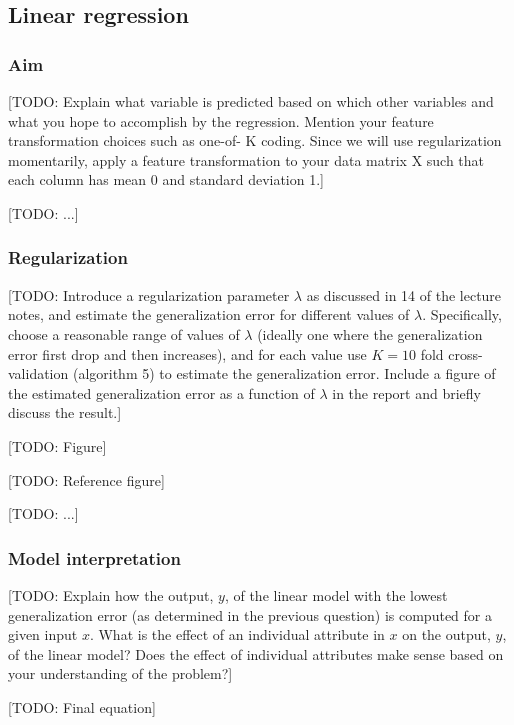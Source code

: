 \documentclass[dtu]{dtuarticle}
\newcommand{\todo}[1]{\color{red}[TODO: #1]\color{black}}
\begin{document}
	\subsection{Linear regression}

	\subsubsection{Aim}

	\todo{Explain what variable is predicted based on which other variables and what you hope to
		accomplish by the regression. Mention your feature transformation choices such as one-of-
		K coding. Since we will use regularization momentarily, apply a feature transformation to
		your data matrix X such that each column has mean 0 and standard deviation 1.}

	\todo{...}

	\subsubsection{Regularization}

	\todo{Introduce a regularization parameter $\lambda$ as discussed in 14 of the lecture notes, and estimate
		the generalization error for different values of $\lambda$. Specifically, choose a reasonable range of
		values of $\lambda$ (ideally one where the generalization error first drop and then increases), and
		for each value use $K = 10$ fold cross-validation (algorithm 5) to estimate the generalization
		error. Include a figure of the estimated generalization error as a function of $\lambda$ in the report
		and briefly discuss the result.}

	\todo{Figure}

	\todo{Reference figure}

	\todo{...}

	\subsubsection{Model interpretation}

	\todo{Explain how the output, $y$, of the linear model with the lowest generalization error (as
		determined in the previous question) is computed for a given input $x$. What is the effect
		of an individual attribute in $x$ on the output, $y$, of the linear model? Does the effect of
		individual attributes make sense based on your understanding of the problem?}

	\todo{Final equation}
\end{document}
